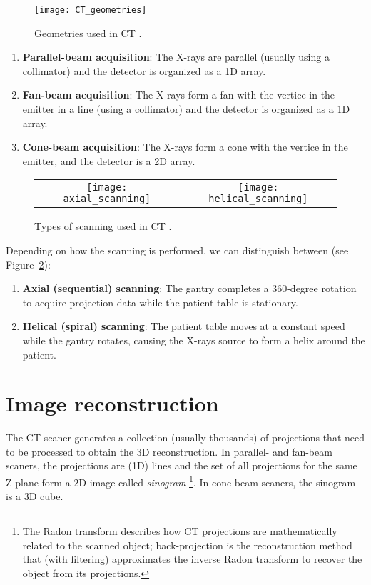 \begin{figure}
  \centering
  \texttt{[image: CT\_geometries]}
  \caption{Geometries used in CT \cite{takase2025CT}.\label{fig:CT_geometries}}
\end{figure}

\begin{enumerate}
\item \textbf{Parallel-beam acquisition}: The X-rays are parallel
  (usually using a collimator) and the detector is organized as a 1D
  array.

\item \textbf{Fan-beam acquisition}: The X-rays form a fan with the vertice in the emitter
  in a line (using a collimator) and the detector is organized as a 1D
  array.

\item \textbf{Cone-beam acquisition}: The X-rays form a cone with the
  vertice in the emitter, and the detector is a 2D array.
  
\end{enumerate}

\begin{figure}
  \centering
  \begin{tabular}{cc}
    \texttt{[image: axial\_scanning]} & \texttt{[image: helical\_scanning]}
  \end{tabular}
  \caption{Types of scanning used in CT \cite{abdulla2025acquiring1}.\label{fig:scannings}}
\end{figure}

Depending on how the scanning is performed, we can distinguish between
(see Figure~\ref{fig:scannings}):

\begin{enumerate}
\item \textbf{Axial (sequential) scanning}:
  The gantry completes a 360-degree rotation to acquire projection
  data while the patient table is stationary. 

\item \textbf{Helical (spiral) scanning}: The patient table moves
  at a constant speed while the gantry rotates, causing the X-rays
  source to form a helix around the patient.
\end{enumerate}

\section{Image reconstruction}
The CT scaner generates a collection (usually thousands) of
projections that need to be processed to obtain the 3D
reconstruction. In parallel- and fan-beam scaners, the projections are
(1D) lines and the set of all projections for the same Z-plane form a
2D image called \emph{sinogram}
\cite{wikipedia2025radom_transform}\footnote{The Radon transform
  describes how CT projections are mathematically related to the
  scanned object; back-projection is the reconstruction method that
  (with filtering) approximates the inverse Radon transform to recover
  the object from its projections.}. In cone-beam scaners, the
sinogram is a 3D cube.

